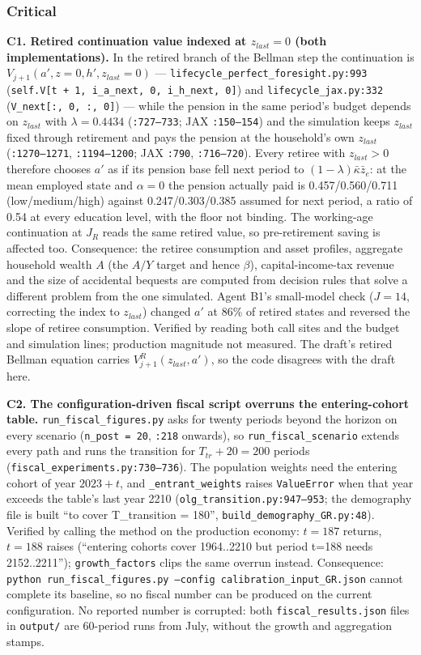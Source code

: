 \documentclass[11pt,a4paper]{article}
\newcommand{\code}[1]{\texttt{#1}}
\begin{document}
\subsubsection*{Critical}

\textbf{C1. Retired continuation value indexed at $z_{last} = 0$ (both implementations).} In the retired branch of the Bellman step the continuation is $V_{j+1}(a', z = 0, h', z_{last} = 0)$ --- \code{lifecycle_perfect_foresight.py:993} (\code{self.V[t + 1, i_a_next, 0, i_h_next, 0]}) and \code{lifecycle_jax.py:332} (\code{V_next[:, 0, :, 0]}) --- while the pension in the same period's budget depends on $z_{last}$ with $\lambda = 0.4434$ (\code{:727--733}; JAX \code{:150--154}) and the simulation keeps $z_{last}$ fixed through retirement and pays the pension at the household's own $z_{last}$ (\code{:1270--1271}, \code{:1194--1200}; JAX \code{:790}, \code{:716--720}). Every retiree with $z_{last} > 0$ therefore chooses $a'$ as if its pension base fell next period to $(1-\lambda)\bar{\kappa}\bar{z}_e$: at the mean employed state and $\alpha = 0$ the pension actually paid is 0.457/0.560/0.711 (low/medium/high) against 0.247/0.303/0.385 assumed for next period, a ratio of 0.54 at every education level, with the floor not binding. The working-age continuation at $J_R$ reads the same retired value, so pre-retirement saving is affected too. Consequence: the retiree consumption and asset profiles, aggregate household wealth $A$ (the $A/Y$ target and hence $\beta$), capital-income-tax revenue and the size of accidental bequests are computed from decision rules that solve a different problem from the one simulated. Agent B1's small-model check ($J = 14$, correcting the index to $z_{last}$) changed $a'$ at 86\% of retired states and reversed the slope of retiree consumption. Verified by reading both call sites and the budget and simulation lines; production magnitude not measured. The draft's retired Bellman equation carries $V^R_{j+1}(z_{last}, a')$, so the code disagrees with the draft here.

\textbf{C2. The configuration-driven fiscal script overruns the entering-cohort table.} \code{run_fiscal_figures.py} asks for twenty periods beyond the horizon on every scenario (\code{n_post = 20}, \code{:218} onwards), so \code{run_fiscal_scenario} extends every path and runs the transition for $T_{tr} + 20 = 200$ periods (\code{fiscal_experiments.py:730--736}). The population weights need the entering cohort of year $2023 + t$, and \code{_entrant_weights} raises \code{ValueError} when that year exceeds the table's last year 2210 (\code{olg_transition.py:947--953}; the demography file is built ``to cover T_transition = 180'', \code{build_demography_GR.py:48}). Verified by calling the method on the production economy: $t = 187$ returns, $t = 188$ raises (``entering cohorts cover 1964..2210 but period t=188 needs 2152..2211''); \code{growth_factors} clips the same overrun instead. Consequence: \code{python run_fiscal_figures.py --config calibration_input_GR.json} cannot complete its baseline, so no fiscal number can be produced on the current configuration. No reported number is corrupted: both \code{fiscal_results.json} files in \code{output/} are 60-period runs from July, without the growth and aggregation stamps.
\end{document}
